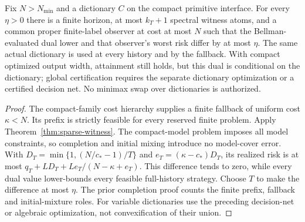 \begin{corollary}\label{cor:complete-certificate}
Fix $N>N_{\min}$ and a dictionary $C$ on the compact primitive interface. For every $\eta>0$ there is a finite horizon, at most $k_T+1$ spectral witness atoms, and a common proper finite-label observer at cost at most $N$ such that the Bellman-evaluated dual lower and that observer's worst risk differ by at most $\eta$. The same actual dictionary is used at every history and by the fallback. With compact optimized output width, attainment still holds, but this dual is conditional on the dictionary; global certification requires the separate dictionary optimization or a certified decision net. No minimax swap over dictionaries is authorized.
\end{corollary}
\begin{proof}
The compact-family cost hierarchy supplies a finite fallback of uniform cost $\kappa<N$. Its prefix is strictly feasible for every reserved finite problem. Apply Theorem~\ref{thm:sparse-witness}. The compact-model problem imposes all model constraints, so completion and initial mixing introduce no model-cover error. With $D_T=\min\{1,(N/c_*-1)/T\}$ and $e_T=(\kappa-c_*)D_T$, its realized risk is at most
$q_T+LD_T+Le_T/(N-\kappa+e_T)$. This difference tends to zero, while every dual value lower-bounds every feasible full-history strategy. Choose $T$ to make the difference at most $\eta$. The prior completion proof counts the finite prefix, fallback and initial-mixture roles. For variable dictionaries use the preceding decision-net or algebraic optimization, not convexification of their union.
\end{proof}


